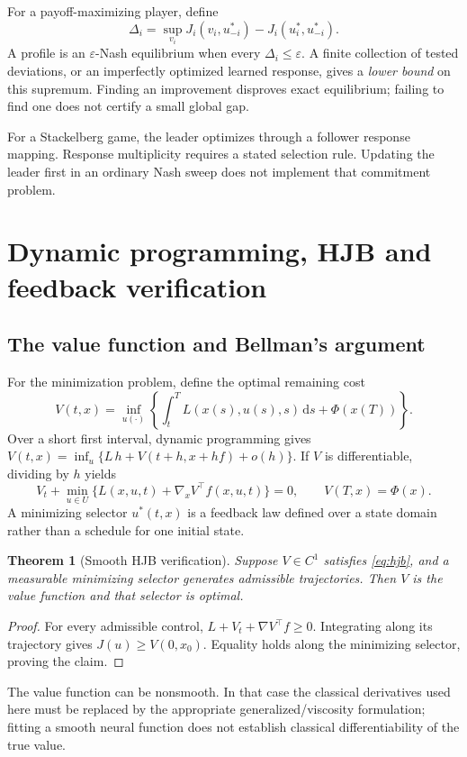 \documentclass[11pt,a4paper]{article}
\newcommand{\dd}{\,\mathrm{d}}
\newtheorem{theorem}[proposition]{Theorem}
\theoremstyle{definition}
\theoremstyle{remark}
\begin{document}
For a payoff-maximizing player, define
\begin{equation}
\Delta_i=\sup_{v_i}J_i(v_i,u_{-i}^*)-J_i(u_i^*,u_{-i}^*).
\end{equation}
A profile is an $\varepsilon$-Nash equilibrium when every $\Delta_i\le\varepsilon$. A finite collection of tested deviations, or an imperfectly optimized learned response, gives a \emph{lower bound} on this supremum. Finding an improvement disproves exact equilibrium; failing to find one does not certify a small global gap.

For a Stackelberg game, the leader optimizes through a follower response mapping. Response multiplicity requires a stated selection rule. Updating the leader first in an ordinary Nash sweep does not implement that commitment problem.

\section{Dynamic programming, HJB and feedback verification}
\subsection{The value function and Bellman's argument}
For the minimization problem, define the optimal remaining cost
\begin{equation}
V(t,x)=\inf_{u(\cdot)}\left\{\int_t^T L(x(s),u(s),s)\dd s+\Phi(x(T))\right\}.
\end{equation}
Over a short first interval, dynamic programming gives
$V(t,x)=\inf_u\{L\,h+V(t+h,x+hf)+o(h)\}$. If $V$ is differentiable, dividing by $h$ yields
\begin{equation}
V_t+\min_{u\in U}\{L(x,u,t)+\nabla_xV^\top f(x,u,t)\}=0,
\qquad V(T,x)=\Phi(x).
\label{eq:hjb}
\end{equation}
A minimizing selector $u^*(t,x)$ is a feedback law defined over a state domain rather than a schedule for one initial state.

\begin{theorem}[Smooth HJB verification]
Suppose $V\in C^1$ satisfies \eqref{eq:hjb}, and a measurable minimizing selector generates admissible trajectories. Then $V$ is the value function and that selector is optimal.
\end{theorem}
\begin{proof}
For every admissible control, $L+V_t+\nabla V^\top f\ge0$. Integrating along its trajectory gives $J(u)\ge V(0,x_0)$. Equality holds along the minimizing selector, proving the claim.
\end{proof}
The value function can be nonsmooth. In that case the classical derivatives used here must be replaced by the appropriate generalized/viscosity formulation; fitting a smooth neural function does not establish classical differentiability of the true value.
\end{document}
